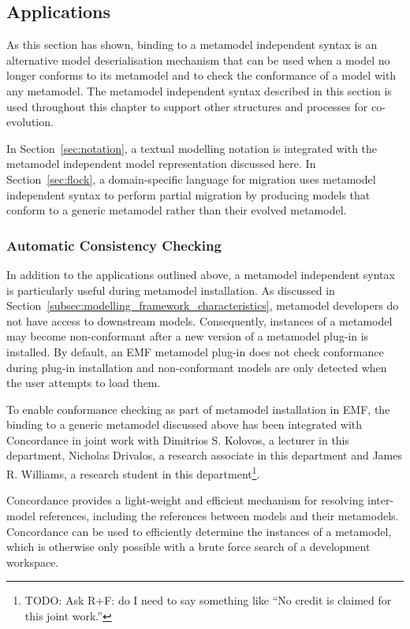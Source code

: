 \subsection{Applications}
As this section has shown, binding to a metamodel independent syntax is an alternative model deserialisation mechanism that can be used when a model no longer conforms to its metamodel and to check the conformance of a model with any metamodel. The metamodel independent syntax described in this section is used throughout this chapter to support other structures and processes for co-evolution.

In Section~\ref{sec:notation}, a textual modelling notation is integrated with the metamodel independent model representation discussed here. In Section~\ref{sec:flock}, a domain-specific language for migration uses metamodel independent syntax to perform partial migration by producing models that conform to a generic metamodel rather than their evolved metamodel.

\subsubsection{Automatic Consistency Checking}
\label{subsec:automatic_checking}
In addition to the applications outlined above, a metamodel independent syntax is particularly useful during metamodel installation. As discussed in Section~\ref{subsec:modelling_framework_characteristics}, metamodel developers do not have access to downstream models. Consequently, instances of a metamodel may become non-conformant after a new version of a metamodel plug-in is installed. By default, an EMF metamodel plug-in does not check conformance during plug-in installation and non-conformant models are only detected when the user attempts to load them.

To enable conformance checking as part of metamodel installation in EMF, the binding to a generic metamodel discussed above has been integrated with Concordance \cite{rose10concordance} in joint work with Dimitrios S. Kolovos, a lecturer in this department, Nicholas Drivalos, a research associate in this department and James R. Williams, a research student in this department\footnote{TODO: Ask R+F: do I need to say something like ``No credit is claimed for this joint work.''}.   

Concordance provides a light-weight and efficient mechanism for resolving inter-model references, including the references between models and their metamodels. Concordance can be used to efficiently determine the instances of a metamodel, which is otherwise only possible with a brute force search of a development workspace.

